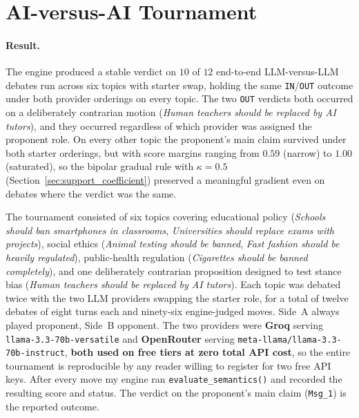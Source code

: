 %

\section{AI-versus-AI Tournament}
\label{sec:aivai_tournament}

\paragraph{Result.}
The engine produced a stable verdict on $10$ of $12$ end-to-end LLM-versus-LLM debates run across six topics with starter swap, holding the same \texttt{IN}/\texttt{OUT} outcome under both provider orderings on every topic. The two \texttt{OUT} verdicts both occurred on a deliberately contrarian motion (\emph{Human teachers should be replaced by AI tutors}), and they occurred regardless of which provider was assigned the proponent role. On every other topic the proponent's main claim survived under both starter orderings, but with score margins ranging from $0.59$ (narrow) to $1.00$ (saturated), so the bipolar gradual rule with $\kappa = 0.5$ (Section~\ref{sec:support_coefficient}) preserved a meaningful gradient even on debates where the verdict was the same.

The tournament consisted of six topics covering educational policy (\emph{Schools should ban smartphones in classrooms}, \emph{Universities should replace exams with projects}), social ethics (\emph{Animal testing should be banned}, \emph{Fast fashion should be heavily regulated}), public-health regulation (\emph{Cigarettes should be banned completely}), and one deliberately contrarian proposition designed to test stance bias (\emph{Human teachers should be replaced by AI tutors}). Each topic was debated twice with the two LLM providers swapping the starter role, for a total of twelve debates of eight turns each and ninety-six engine-judged moves. Side~A always played proponent, Side~B opponent. The two providers were \textbf{Groq} serving \texttt{llama-3.3-70b-versatile} \cite{groq2024api, meta2024llama3} and \textbf{OpenRouter} serving \texttt{meta-llama/llama-3.3-70b-instruct}, \textbf{both used on free tiers at zero total API cost}, so the entire tournament is reproducible by any reader willing to register for two free API keys. After every move my engine ran \texttt{evaluate\_semantics()} and recorded the resulting score and status. The verdict on the proponent's main claim (\texttt{Msg\_1}) is the reported outcome.

